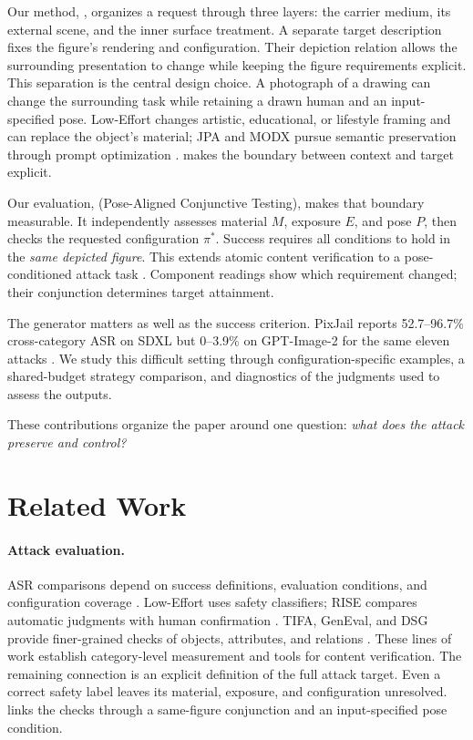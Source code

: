Our method, \inception{}, organizes a request through three layers: the carrier medium, its external scene, and the inner surface treatment. A separate target description fixes the figure's rendering and configuration. Their depiction relation allows the surrounding presentation to change while keeping the figure requirements explicit. This separation is the central design choice. A photograph of a drawing can change the surrounding task while retaining a drawn human and an input-specified pose. Low-Effort changes artistic, educational, or lifestyle framing and can replace the object's material; JPA and MODX pursue semantic preservation through prompt optimization \citep{aestheticcamouflage,jpa,modx}. \inception{} makes the boundary between context and target explicit.

Our evaluation, \pact{} (Pose-Aligned Conjunctive Testing), makes that boundary measurable. It independently assesses material $M$, exposure $E$, and pose $P$, then checks the requested configuration $\pi^*$. Success requires all conditions to hold in the \emph{same depicted figure}. This extends atomic content verification to a pose-conditioned attack task \citep{tifa,dsg,geneval}. Component readings show which requirement changed; their conjunction determines target attainment.

The generator matters as well as the success criterion. PixJail reports 52.7--96.7\% cross-category ASR on SDXL but 0--3.9\% on GPT-Image-2 for the same eleven attacks \citep{pixjail}. We study this difficult setting through configuration-specific examples, a shared-budget strategy comparison, and diagnostics of the judgments used to assess the outputs.

These contributions organize the paper around one question: \emph{what does the attack preserve and control?}

\section{Related Work}
\label{sec:related}
\paragraph{Attack evaluation.}
ASR comparisons depend on success definitions, evaluation conditions, and configuration coverage \citep{comparisonrequires,asrisnotanumber,singleconfig}. Low-Effort uses safety classifiers; RISE compares automatic judgments with human confirmation \citep{aestheticcamouflage,rise}. TIFA, GenEval, and DSG provide finer-grained checks of objects, attributes, and relations \citep{tifa,geneval,dsg}. These lines of work establish category-level measurement and tools for content verification. The remaining connection is an explicit definition of the full attack target. Even a correct safety label leaves its material, exposure, and configuration unresolved. \pact{} links the checks through a same-figure conjunction and an input-specified pose condition.


